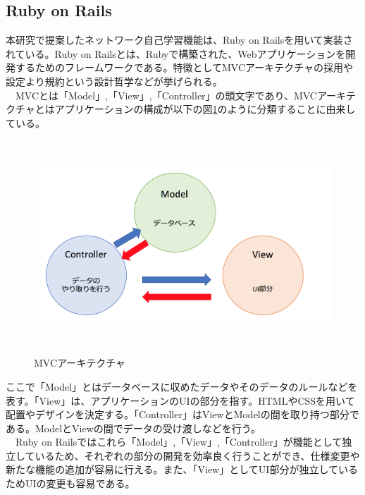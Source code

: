 \subsection{Ruby on Rails}
\label{tag:rails}
本研究で提案したネットワーク自己学習機能は、Ruby on Railsを用いて実装されている。Ruby on Railsとは、Rubyで構築された、Webアプリケーションを開発するためのフレームワークである。特徴としてMVCアーキテクチャの採用や設定より規約という設計哲学などが挙げられる。\\
　MVCとは「Model」,「View」,「Controller」の頭文字であり、MVCアーキテクチャとはアプリケーションの構成が以下の図\ref{fig:MVC}のように分類することに由来している。


\begin{figure}[htbp]
  \begin{center}
    \includegraphics[clip,width=12.0cm,height=8.0cm]{img/mvc.png}
    \caption{MVCアーキテクチャ}
    \label{fig:MVC}
  \end{center}
\end{figure}

ここで「Model」とはデータベースに収めたデータやそのデータのルールなどを表す。「View」は、アプリケーションのUIの部分を指す。HTMLやCSSを用いて配置やデザインを決定する。「Controller」はViewとModelの間を取り持つ部分である。ModelとViewの間でデータの受け渡しなどを行う。\\
　Ruby on Railsではこれら「Model」,「View」,「Controller」が機能として独立しているため、それぞれの部分の開発を効率良く行うことができ、仕様変更や新たな機能の追加が容易に行える。また、「View」としてUI部分が独立しているためUIの変更も容易である。
